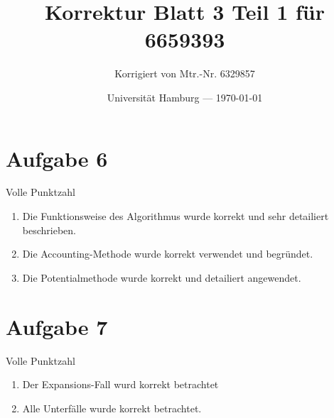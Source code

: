 \documentclass[parskip=half,a4paper]{scrartcl}
\title{Korrektur Blatt 3 Teil 1 für 6659393}
\author{Korrigiert von Mtr.-Nr. 6329857}
\date{Universität Hamburg --- \today}
\begin{document}
\maketitle %

\section*{Aufgabe 6}

Volle Punktzahl

\begin{enumerate}
    \item Die Funktionsweise des Algorithmus wurde korrekt und sehr detailiert beschrieben.

    \item Die Accounting-Methode wurde korrekt verwendet und begründet.

    \item Die Potentialmethode wurde korrekt und detailiert angewendet.
\end{enumerate}

\section*{Aufgabe 7}

Volle Punktzahl


\begin{enumerate}
    \item Der Expansions-Fall wurd korrekt betrachtet

    \item Alle Unterfälle wurde korrekt betrachtet.
\end{enumerate}
\end{document}
